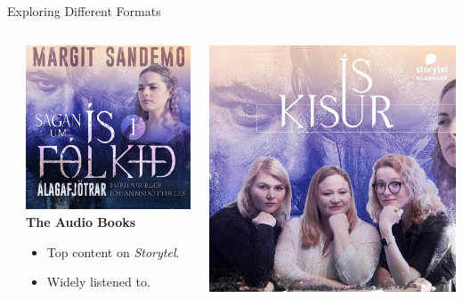 \begin{frame}{Exploring Different Formats}
\begin{columns}[T]
\begin{column}{0.32\textwidth}
    \end{column}
\pause
    \begin{column}{0.32\textwidth}
        \includegraphics[width=\textwidth]{../figures/álagafjötrar_storytel}\\
      \textbf{The Audio Books}
      \begin{itemize}
        \item Top content on \emph{Storytel}.
        \item Widely listened to.
      \end{itemize}
    \end{column}
\pause
\begin{column}{0.32\textwidth}
  \includegraphics[width=\textwidth]{../figures/álagafjötrar_ískisur}\\

\end{column}
\end{columns}
\end{frame}
